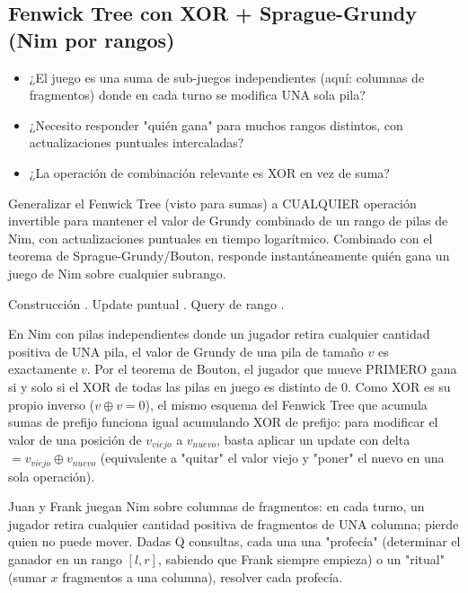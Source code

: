 \subsection{Fenwick Tree con XOR + Sprague-Grundy (Nim por rangos)}
\label{alg:3-3}


\begin{itemize}
\item ¿El juego es una suma de sub-juegos independientes (aquí: columnas de fragmentos) donde en cada turno se modifica UNA sola pila?
\item ¿Necesito responder "quién gana" para muchos rangos distintos, con actualizaciones puntuales intercaladas?
\item ¿La operación de combinación relevante es XOR en vez de suma?
\end{itemize}

 Generalizar el Fenwick Tree (visto para sumas) a CUALQUIER operación invertible para mantener el valor de Grundy combinado de un rango de pilas de Nim, con actualizaciones puntuales en tiempo logarítmico. Combinado con el teorema de Sprague-Grundy/Bouton, responde instantáneamente quién gana un juego de Nim sobre cualquier subrango.

 Construcción . Update puntual . Query de rango .

 En Nim con pilas independientes donde un jugador retira cualquier cantidad positiva de UNA pila, el valor de Grundy de una pila de tamaño $v$ es exactamente $v$. Por el teorema de Bouton, el jugador que mueve PRIMERO gana si y solo si el XOR de todas las pilas en juego es distinto de 0. Como XOR es su propio inverso ($v \oplus v = 0$), el mismo esquema del Fenwick Tree que acumula sumas de prefijo funciona igual acumulando XOR de prefijo: para modificar el valor de una posición de $v_{viejo}$ a $v_{nuevo}$, basta aplicar un update con delta $= v_{viejo} \oplus v_{nuevo}$ (equivalente a "quitar" el valor viejo y "poner" el nuevo en una sola operación).~\cite{bouton1901,sprague1935}


Juan y Frank juegan Nim sobre columnas de fragmentos: en cada turno, un jugador retira cualquier cantidad positiva de fragmentos de UNA columna; pierde quien no puede mover. Dadas Q consultas, cada una una "profecía" (determinar el ganador en un rango $[l,r]$, sabiendo que Frank siempre empieza) o un "ritual" (sumar $x$ fragmentos a una columna), resolver cada profecía.

